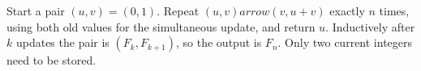 Start a pair $(u,v)=(0,1)$. Repeat $(u,v)arrow(v,u+v)$ exactly $n$ times, using both old values for the simultaneous update, and return $u$. Inductively after $k$ updates the pair is $(F_k,F_{k+1})$, so the output is $F_n$. Only two current integers need to be stored.
